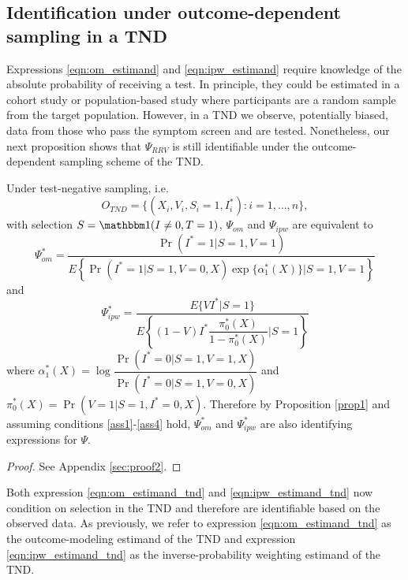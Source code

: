 \documentclass[11pt]{article}
\begin{document}
\subsection{Identification under outcome-dependent sampling in a TND}

Expressions \ref{eqn:om_estimand} and \ref{eqn:ipw_estimand} require knowledge of the absolute probability of receiving a test. In principle, they could be estimated in a cohort study or population-based study where participants are a random sample from the target population. However, in a TND we observe, potentially biased, data from those who pass the symptom screen and are tested. Nonetheless, our next proposition shows that $\Psi_{RRV}$ is still identifiable under the outcome-dependent sampling scheme of the TND. 
 \begin{proposition}\label{prop2}
      Under test-negative sampling, i.e. 
      $$O_{TND} = \{(X_i, V_i, S_i=1, I^*_i) : i = 1, \ldots, n\},$$ 
      with selection $S = \mathbbm 1(I\neq 0, T = 1)$, $\Psi_{om}$ and $\Psi_{ipw}$ are equivalent to 
    \begin{equation}\label{eqn:om_estimand_tnd}
        \Psi_{om}^* = \dfrac{\Pr(I^* = 1 | S = 1, V = 1)}{E\left\{  \Pr(I^* = 1 | S = 1, V = 0, X) \exp\{\alpha^*_1(X)\}\Big| S = 1, V = 1 \right\}}
    \end{equation}
    and 
    \begin{equation}\label{eqn:ipw_estimand_tnd}
        \Psi_{ipw}^* = \dfrac{E\{VI^*|S =1\}}{E\left\{ (1 - V) I^* \dfrac{\pi^*_0(X)}{1 - \pi^*_0(X)} \bigg| S = 1\right\}}
    \end{equation}
    where $\alpha^*_1(X) = \log \dfrac{\Pr(I^* = 0 | S = 1, V = 1, X)}{\Pr(I^* = 0| S = 1, V = 0, X)}$ and $\pi^*_0(X) = \Pr(V = 1| S = 1, I^* = 0, X)$. Therefore by Proposition \ref{prop1} and assuming conditions \ref{ass1}-\ref{ass4} hold, $\Psi_{om}^*$ and $\Psi_{ipw}^*$ are also identifying expressions for $\Psi$.
 \end{proposition}
 \begin{proof}
    See Appendix \ref{sec:proof2}.
 \end{proof}
    
 Both expression \ref{eqn:om_estimand_tnd} and  \ref{eqn:ipw_estimand_tnd} now condition on selection in the TND and therefore are identifiable based on the observed data. As previously, we refer to expression \ref{eqn:om_estimand_tnd} as the outcome-modeling estimand of the TND and expression \ref{eqn:ipw_estimand_tnd} as the inverse-probability weighting estimand of the TND.
\end{document}
